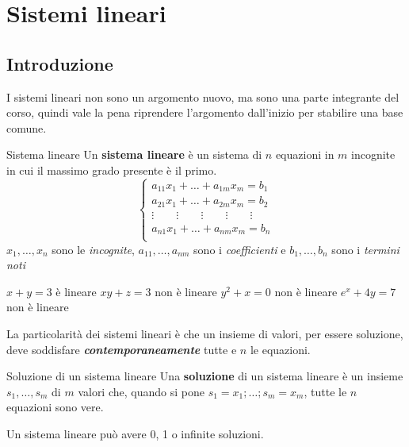 \chapter{Sistemi lineari}
\section{Introduzione}
I sistemi lineari non sono un argomento nuovo, ma sono una parte integrante del corso, quindi vale la pena riprendere l'argomento dall'inizio per stabilire una base comune.
\begin{newdef}{Sistema lineare}
    Un \textbf{sistema lineare} è un sistema di $n$ equazioni in $m$ incognite in cui il massimo grado presente è il primo.
    \[
        \begin{cases}
            a_{11}x_{1} + \dots + a_{1m}x_{m} = b_1 \\
            a_{21}x_{1} + \dots + a_{2m}x_{m} = b_2 \\
            \vdots \quad\quad \vdots \quad\quad \vdots \quad\quad \vdots \quad\quad \vdots \\
            a_{n1}x_{1} + \dots + a_{nm}x_{m} = b_n \\  
        \end{cases}
    \]
    $x_1, \dots, x_n$ sono le \textit{incognite}, $a_{11}, \dots, a_{nm}$ sono i \textit{coefficienti} e $b_1, \dots, b_n$ sono i \textit{termini noti}
\end{newdef}
\begin{center}
    $x + y = 3$ è lineare \hspace{2cm} $xy + z = 3$ non è lineare \hspace{2cm} $y^2 + x = 0$ non è lineare \hspace{2cm} $e^x + 4y = 7$ non è lineare
\end{center}

La particolarità dei sistemi lineari è che un insieme di valori, per essere soluzione, deve soddisfare \textbf{\textit{contemporaneamente}} tutte e $n$ le equazioni.

\begin{newdef}{Soluzione di un sistema lineare}
    Una \textbf{soluzione} di un sistema lineare è un insieme $s_1, \dots, s_m$ di $m$ valori che, quando si pone $s_1 = x_1; \dots; s_m = x_m$, tutte le $n$ equazioni sono vere.

    Un sistema lineare può avere 0, 1 o infinite soluzioni.
\end{newdef}

